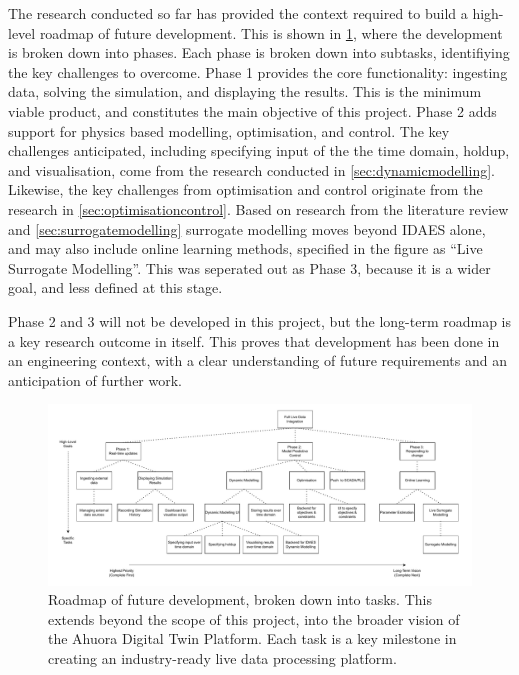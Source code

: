 The research conducted so far has provided the context required to build a high-level roadmap of future development. This is shown in \cref{fig:development_flowchart}, where the development is broken down into phases. Each phase is broken down into subtasks, identifiying the key challenges to overcome.
Phase 1 provides the core functionality: ingesting data, solving the simulation, and displaying the results. This is the minimum viable product, and constitutes the main objective of this project. Phase 2 adds support for physics based modelling, optimisation, and control. The key challenges anticipated, including specifying input of the the time domain, holdup, and visualisation, come from the research conducted in \cref{sec:dynamicmodelling}. Likewise, the key challenges from optimisation and control originate from the research in \cref{sec:optimisationcontrol}. Based on research from the literature review and \cref{sec:surrogatemodelling} surrogate modelling moves beyond IDAES alone, and may also include online learning methods, specified in the figure as ``Live Surrogate Modelling''. This was seperated out as Phase 3, because it is a wider goal, and less defined at this stage. 

Phase 2 and 3 will not be developed in this project, but the long-term roadmap is a key research outcome in itself. This proves that development has been done in an engineering context, with a clear understanding of future requirements and an anticipation of further work.


\begin{landscape}
    \begin{figure}
        \centering
        \includegraphics[width=1.5\textwidth]{roadmap.pdf}
        \caption{Roadmap of future development, broken down into tasks. This extends beyond the scope of this project, into the broader vision of the Ahuora Digital Twin Platform. Each task is a key milestone in creating an industry-ready live data processing platform.}
        \label{fig:development_flowchart}
    \end{figure}
\end{landscape}

